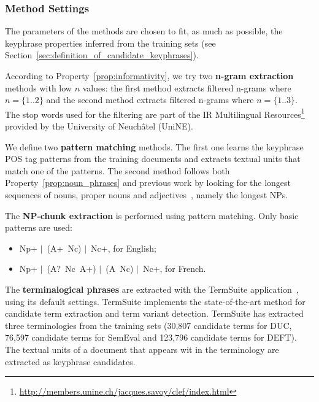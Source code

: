     \subsubsection{Method Settings}
    \label{subsubsec:method_settings}
      The parameters of the methods are chosen to fit, as much as possible, the
      keyphrase properties inferred from the training sets (see
      Section~\ref{sec:definition_of_candidate_keyphrases}).

      According to Property~\ref{prop:informativity}, we try two \textbf{n-gram
      extraction} methods with low $n$ values: the first method extracts
      filtered n-grams where $n = \{1..2\}$ and the second method extracts
      filtered n-grams where $n = \{1..3\}$. The stop words used for the
      filtering are part of the IR Multilingual
      Resources\footnote{\url{http://members.unine.ch/jacques.savoy/clef/index.html}}
      provided by the University of Neuchâtel (UniNE).

      We define two \textbf{pattern matching} methods. The first one learns the
      keyphrase POS tag patterns from the training documents and extracts
      textual units that match one of the patterns. The second method follows
      both Property~\ref{prop:noun_phrases} and previous work by looking for
      the longest sequences of nouns, proper nouns and
      adjectives~\cite{hassan2010conundrums}, namely the longest NPs.

      The \textbf{NP-chunk extraction} is performed using pattern matching. Only
      basic patterns are used: 
      \begin{itemize}
        \item{Np+ $|$~(A+~Nc) $|$~Nc+, for English;}
        \item{Np+ $|$~(A?~Nc~A+) $|$~(A~Nc) $|$~Nc+, for French.}
      \end{itemize}


      The \textbf{terminalogical phrases} are extracted with the TermSuite
      application~\cite{rocheteau2011termsuite}, using its default settings.
      TermSuite implements the state-of-the-art method for candidate term
      extraction and term variant detection. TermSuite has extracted three
      terminologies from the training sets (30,807 candidate terms for DUC,
      76,597 candidate terms for SemEval and 123,796 candidate terms for DEFT).
      The textual units of a document that appears wit in the terminology are
      extracted as keyphrase candidates.

